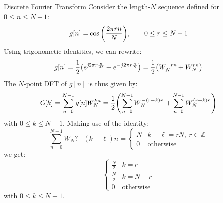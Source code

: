 \documentclass[../../main/main.tex]{subfiles}
\begin{document}
\begin{example}{Discrete Fourier Transform}{}
    Consider the length-\( N \) sequence defined for \( 0 \le n \le N-1 \):
    \begin{equation}
        g[n]
        =
        \cos\qty(\frac{2\pi rn}{N}),
        \qquad
        0 \le r \le N-1
        \label{eq:L12_S13_1}
    \end{equation}
    Using trigonometic identities, we can rewrite:
    \begin{equation}
        g[n]
        =
        \frac{1}{2} \qty(e^{j2\pi r \frac{n}{M}} + e^{-j2\pi r \frac{n}{N}})
        =
        \frac{1}{2} \qty(W_{N}^{-rn} + W_{N}^{rn})
        \label{eq:L12_S13_2}
    \end{equation}
    The \( N \)-point DFT of \( g[n] \) is thus given by:
    \begin{equation}
        G[k]
        =
        \sum_{n=0}^{N-1} g[n] W_{N}^{kn}
        =
        \frac{1}{2} \qty(\sum_{n=0}^{N-1} W_{N}^{-(r-k)n} + \sum_{n=0}^{N-1} W_{N}^{(r+k)n} )
        \label{eq:L12_S14_1}
    \end{equation}
    with \( 0 \le k \le N-1 \). Making use of the identity:
    \begin{equation}
        \sum_{n=0}^{N-1} W_{N}?{-(k-\ell)n}
        =
        \begin{cases}
            N   &   k-\ell = rN, \ r \in \mathbb{Z} \\
            0   &   \text{otherwise}
        \end{cases}
        \label{eq:L12_S15_1}
    \end{equation}
    we get:
    \begin{equation}
        \begin{cases}
            \frac{N}{2} &   k=r \\
            \frac{N}{2} &   k=N-r   \\
            0   &   \text{otherwise}
        \end{cases}
        \label{eq:L12_S15_2}
    \end{equation}
    with \( 0 \le k \le N-1 \).
\end{example}
\end{document}
